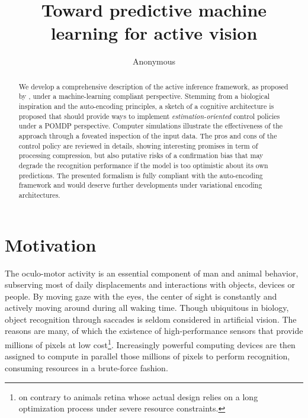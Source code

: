 \documentclass{article} %
\title{Toward predictive machine learning for active vision}
\author{Anonymous
}
\begin{document}
\maketitle

\begin{abstract}
We develop a comprehensive description of the active inference framework, as proposed by \cite{friston2010free}, under a machine-learning compliant perspective. Stemming from a biological inspiration and the auto-encoding principles, a sketch of a cognitive architecture is proposed that should provide ways to implement \emph{estimation-oriented} control policies under a POMDP perspective. 
Computer simulations illustrate the effectiveness of the approach through a foveated inspection of the input data.
The pros and cons of the control policy are reviewed in details, showing interesting promises in term of processing compression, but also putative risks of a confirmation bias that may degrade the recognition performance if the model is too optimistic about its own predictions. The presented formalism is fully compliant with the auto-encoding framework and would deserve further developments under variational encoding architectures.
\end{abstract}

\section{Motivation}

	The oculo-motor activity is an essential component of man and animal behavior, subserving most of daily displacements and interactions with objects, devices or people. By moving gaze with the eyes, the center of sight is constantly and actively moving around during all waking time.  %
	Though ubiquitous in biology, object recognition through saccades is seldom considered in artificial vision. The reasons are many, of which the existence of high-performance sensors that provide millions of pixels at low cost\footnote{on contrary to animals retina whose actual design relies on a long optimization process under severe resource constraints.}. Increasingly powerful computing devices are then assigned to compute in parallel those millions of pixels to perform recognition, consuming resources in a brute-force fashion. 
	
\end{document}
